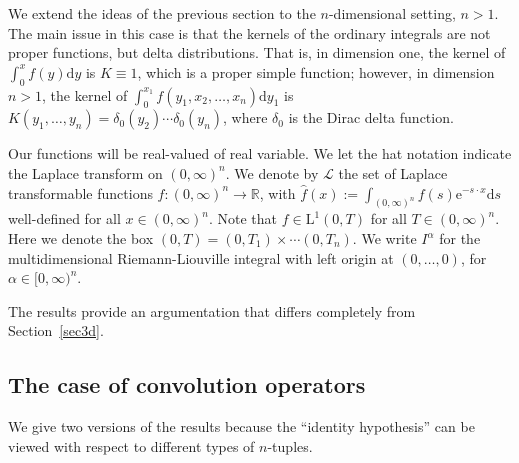 \documentclass[12pt,reqno]{amsart}
\theoremstyle{plain}
\numberwithin{equation}{section} %
\begin{document}
We extend the ideas of the previous section to the $n$-dimensional setting, $n>1$. The main issue in this case is that the kernels of the ordinary integrals are not proper functions, but delta distributions. That is, in dimension one, the kernel of $\int_0^x f(y)\mathrm{d}y$ is $K\equiv 1$, which is a proper simple function; however, in dimension $n>1$, the kernel of $\int_0^{x_1} f(y_1,x_2,\ldots,x_n)\mathrm{d}y_1$ is $K(y_1,\ldots,y_n)=\delta_0(y_2)\cdots \delta_0(y_n)$, where $\delta_0$ is the Dirac delta function. 

Our functions will be real-valued of real variable. We let the hat notation indicate the Laplace transform on $(0,\infty)^n$. We denote by $\mathcal{L}$ the set of Laplace transformable functions $f:(0,\infty)^n\rightarrow\mathbb{R}$, with $\widehat{f}(x):=\int_{(0,\infty)^n} f(s)\mathrm{e}^{-s\cdot x}\mathrm{d}s$ well-defined for all $x\in (0,\infty)^n$. Note that $f\in\mathrm{L}^1(0,T)$ for all $T\in (0,\infty)^n$. Here we denote the box $(0,T)=(0,T_1)\times\cdots (0,T_n)$. We write $I^\alpha$ for the multidimensional Riemann-Liouville integral with left origin at $(0,\ldots,0)$, for $\alpha\in [0,\infty)^n$.

The results provide an argumentation that differs completely from Section~\ref{sec3d}.

\subsection{The case of convolution operators}

We give two versions of the results because the ``identity hypothesis'' can be viewed with respect to different types of $n$-tuples. 
\end{document}
